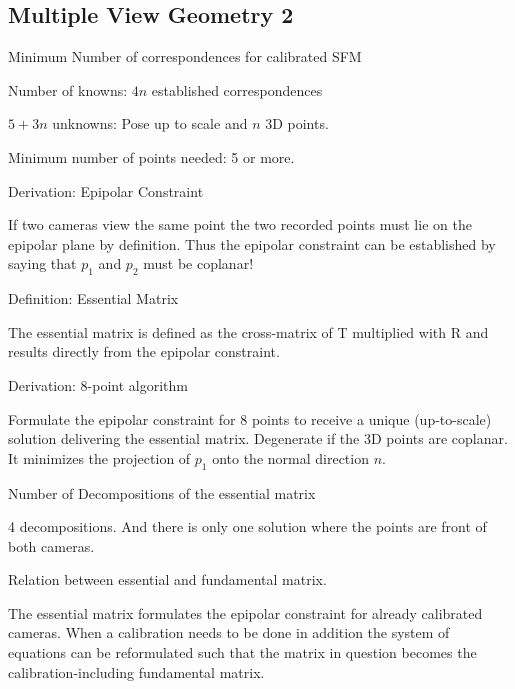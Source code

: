 \documentclass[10pt,a4paper]{scrartcl}
\begin{document}
\begin{multicols*}{2}
\subsection*{Multiple View Geometry 2}

\begin{QandA}
{Minimum Number of correspondences for calibrated SFM}
\item Number of knowns: $4n$ established correspondences
\item $5 + 3n$ unknowns: Pose up to scale and $n$ 3D points.
\item Minimum number of points needed: 5 or more.
\end{QandA}

\begin{QandA}
{Derivation: Epipolar Constraint}
\item If two cameras view the same point the two recorded points must lie on the epipolar plane by definition. Thus the epipolar constraint can be established by saying that $p_1$ and $p_2$ must be coplanar!
\end{QandA}

\begin{QandA}
{Definition: Essential Matrix}
\item The essential matrix is defined as the cross-matrix of T multiplied with R and results directly from the epipolar constraint.
\end{QandA}

\begin{QandA}
{Derivation: 8-point algorithm}
\item Formulate the epipolar constraint for 8 points to receive a unique (up-to-scale) solution delivering the essential matrix. Degenerate if the 3D points are coplanar. It minimizes the projection of $p_1$ onto the normal direction $n$.
\end{QandA}

\begin{QandA}
{Number of Decompositions of the essential matrix}
\item 4 decompositions. And there is only one solution where the points are front of both cameras.
\end{QandA}

\begin{QandA}
{Relation between essential and fundamental matrix.}
\item The essential matrix formulates the epipolar constraint for already calibrated cameras. When a calibration needs to be done in addition the system of equations can be reformulated such that the matrix in question becomes the calibration-including fundamental matrix.
\end{QandA}


\end{multicols*}
\end{document}
